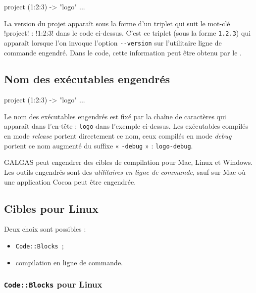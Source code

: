 
\begin{galgas4}
project (1:2:3) -> "logo" {
  ...
}
\end{galgas4}

La version du projet apparaît sous la forme d'un triplet qui suit le mot-clé \ggsq!project! : \ggsq!1:2:3! dans le code ci-dessus. C'est ce triplet (sous la forme \texttt{1.2.3}) qui apparaît lorsque l'on invoque l'option \texttt{-{}-version} sur l'utilitaire ligne de commande engendré.
Dans le code, cette information peut être obtenu par le .


\subsection{Nom des exécutables engendrés}

\begin{galgas4}
project (1:2:3) -> "logo" {
  ...
}
\end{galgas4}

Le nom des exécutables engendrés est fixé par la chaîne de caractères qui apparaît dans l'en-tête : \texttt{logo} dans l'exemple ci-dessus. Les exécutables compilés en mode \emph{release} portent directement ce nom, ceux compilés en mode \emph{debug} portent ce nom augmenté du suffixe « \texttt{-debug} » : \texttt{logo-debug}.



GALGAS peut engendrer des cibles de compilation pour Mac, Linux et Windows. Les outils engendrés sont des \emph{utilitaires en ligne de commande}, sauf sur Mac où une application Cocoa peut être engendrée.

\subsection{Cibles pour Linux}

Deux choix sont possibles :
\begin{itemize}
\item \texttt{Code{}::Blocks}~;
\item compilation en ligne de commande.
\end{itemize}

\subsubsection{\texttt{Code{}::Blocks} pour Linux}

